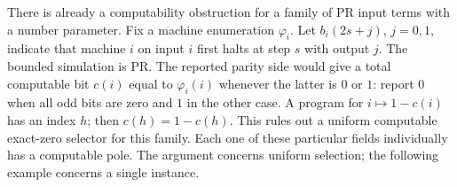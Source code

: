 There is already a computability obstruction for a family of PR input
terms with a number parameter. Fix a machine enumeration $\varphi_i$.
Let $b_i(2s+j)$, $j=0,1$, indicate that machine $i$ on input $i$
first halts at step $s$ with output $j$. The bounded simulation is PR.
The reported parity side would give a total computable bit $c(i)$ equal
to $\varphi_i(i)$ whenever the latter is $0$ or $1$: report $0$ when
all odd bits are zero and $1$ in the other case. A program for
$i\mapsto1-c(i)$ has an index $h$; then $c(h)=1-c(h)$. This rules
out a uniform computable exact-zero selector for this family. Each one
of these particular fields individually has a computable pole. The
argument concerns uniform selection; the following example concerns a
single instance.


